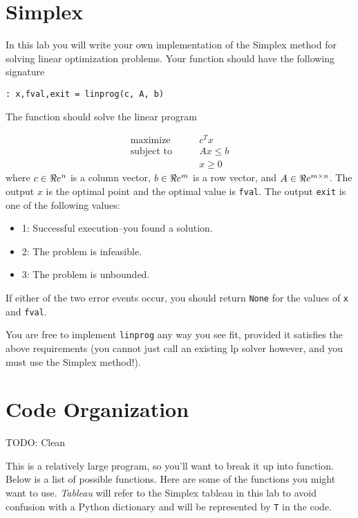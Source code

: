 \label{lab:Simplex}

\section*{Simplex}
In this lab you will write your own implementation of the Simplex method for solving linear optimization problems.
Your function should have the following signature
\begin{lstlisting}[style=python]
: x,fval,exit = linprog(c, A, b)
\end{lstlisting}
The function should solve the linear program

\begin{align*}
\mbox{maximize}\qquad & c^T x \\
\mbox{subject to}\qquad & A x \leq b \\
 & x \geq 0
\end{align*}
where $c \in \Re e^n$ is a column vector, $b \in \Re e^m$ is a row vector, and $A \in \Re e^{m \times n}$.
The output $x$ is the optimal point and the optimal value is {\tt fval}.
The output {\tt exit} is one of the following values:
\begin{itemize}
	\item 1: Successful execution--you found a solution.
	\item 2: The problem is infeasible.
	\item 3: The problem is unbounded.
\end{itemize}
If either of the two error events occur, you should return {\tt None} for the values of {\tt x} and {\tt fval}.

You are free to implement {\tt linprog} any way you see fit, provided it satisfies the above requirements (you cannot just call an existing lp solver however, and you must use the Simplex method!).

\section*{Code Organization}
TODO: Clean

This is a relatively large program, so you'll want to break it up into function.
Below is a list of possible functions.
Here are some of the functions you might want to use.
\emph{Tableau} will refer to the Simplex tableau in this lab to avoid confusion with a Python dictionary and will be represented by {\tt T}  in the code.

